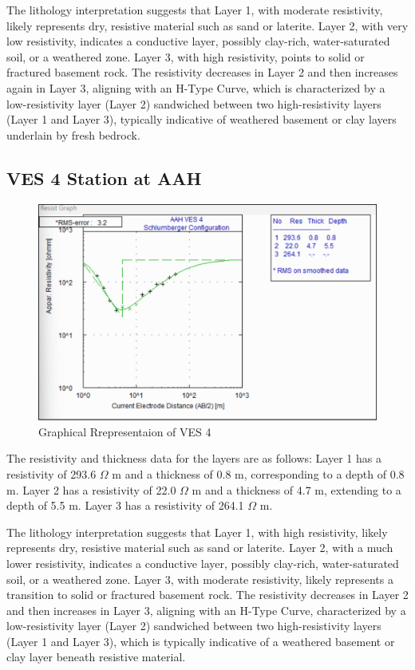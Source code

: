 \documentclass[12pt,a4paper]{report}
\begin{document}
The lithology interpretation suggests that Layer 1, with moderate resistivity, likely represents dry, resistive material such as sand or laterite. Layer 2, with very low resistivity, indicates a conductive layer, possibly clay-rich, water-saturated soil, or a weathered zone. Layer 3, with high resistivity, points to solid or fractured basement rock. The resistivity decreases in Layer 2 and then increases again in Layer 3, aligning with an H-Type Curve, which is characterized by a low-resistivity layer (Layer 2) sandwiched between two high-resistivity layers (Layer 1 and Layer 3), typically indicative of weathered basement or clay layers underlain by fresh bedrock.

\subsection{VES 4 Station at AAH}

\begin{figure}[H]
    \centering
    \includegraphics[width=1.0\textwidth]{aah_ves4.png}
    \caption{Graphical Rrepresentaion of VES 4}
    \label{fig:AAH_VES_4_Curve}
\end{figure}
The resistivity and thickness data for the layers are as follows: Layer 1 has a resistivity of 293.6 $\Omega$ m and a thickness of 0.8 m, corresponding to a depth of 0.8 m. Layer 2 has a resistivity of 22.0 $\Omega$ m and a thickness of 4.7 m, extending to a depth of 5.5 m. Layer 3 has a resistivity of 264.1 $\Omega$ m.

The lithology interpretation suggests that Layer 1, with high resistivity, likely represents dry, resistive material such as sand or laterite. Layer 2, with a much lower resistivity, indicates a conductive layer, possibly clay-rich, water-saturated soil, or a weathered zone. Layer 3, with moderate resistivity, likely represents a transition to solid or fractured basement rock. The resistivity decreases in Layer 2 and then increases in Layer 3, aligning with an H-Type Curve, characterized by a low-resistivity layer (Layer 2) sandwiched between two high-resistivity layers (Layer 1 and Layer 3), which is typically indicative of a weathered basement or clay layer beneath resistive material.
\end{document}
